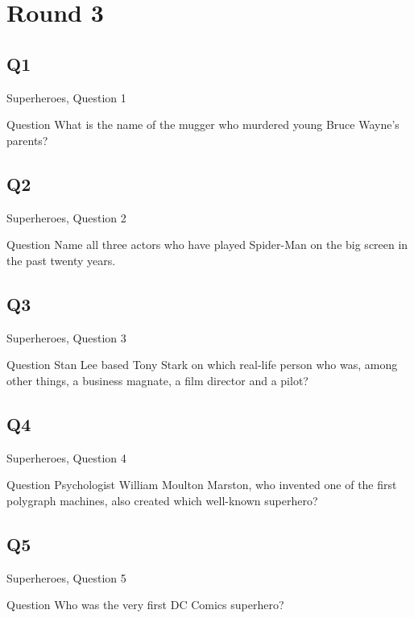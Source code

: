 \documentclass[11pt]{beamer}
\begin{document}
\section{Round 3}
\subsection*{Q1}
\begin{frame}[t]{Superheroes, Question 1}
\begin{block}{Question}
What is the name of the mugger who murdered young Bruce Wayne's parents?
\end{block}
\end{frame}
\subsection*{Q2}
\begin{frame}[t]{Superheroes, Question 2}
\begin{block}{Question}
Name all three actors who have played Spider-Man on the big screen in the past twenty years.
\end{block}
\end{frame}
\subsection*{Q3}
\begin{frame}[t]{Superheroes, Question 3}
\begin{block}{Question}
Stan Lee based Tony Stark on which real-life person who was, among other things, a business magnate, a film director and a pilot?
\end{block}
\end{frame}
\subsection*{Q4}
\begin{frame}[t]{Superheroes, Question 4}
\begin{block}{Question}
Psychologist William Moulton Marston, who invented one of the first polygraph machines, also created which well-known superhero?
\end{block}
\end{frame}
\subsection*{Q5}
\begin{frame}[t]{Superheroes, Question 5}
\begin{block}{Question}
Who was the very first DC Comics superhero?
\end{block}
\end{frame}
\end{document}

